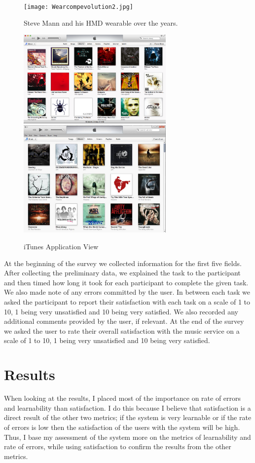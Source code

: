\documentclass[11pt]{article}
\begin{document}
\begin{figure}[H] %
   \centering
   \texttt{[image: Wearcompevolution2.jpg]}       
   \caption{Steve Mann and his HMD wearable over the years. \cite{}}
   \label{fig:spotify_view}
\end{figure}

\begin{figure}[H] %
   \centering
   \includegraphics[width=3in]{iTunes_mac.png}       
   \includegraphics[width=3in]{iTunes_pc.jpg}
   \caption{iTunes Application View}
   \label{fig:iTunes_view}
\end{figure}

 
At the beginning of the survey we collected information for the first five fields. After collecting the preliminary data, we explained the task to the participant and then timed how long it took for each participant to complete the given task. We also made note of any errors committed by the user. In between each task we asked the participant to report their satisfaction with each task on a scale of 1 to 10, 1 being very unsatisfied and 10 being very satisfied. We also recorded any additional comments provided by the user, if relevant. At the end of the survey we asked the user to rate their overall satisfaction with the music service on a scale of 1 to 10, 1 being very unsatisfied and 10 being very satisfied.
\section{Results}
When looking at the results, I placed most of the importance on rate of errors and learnability
than satisfaction. I do this because I believe that satisfaction is a direct result of the other two metrics; if the system is very learnable or if the rate of errors is low then the satisfaction of the users with the system will be high. Thus, I base my assessment of the system more on the metrics of learnability and rate of errors, while using satisfaction to confirm the results from the other metrics.
\end{document}
